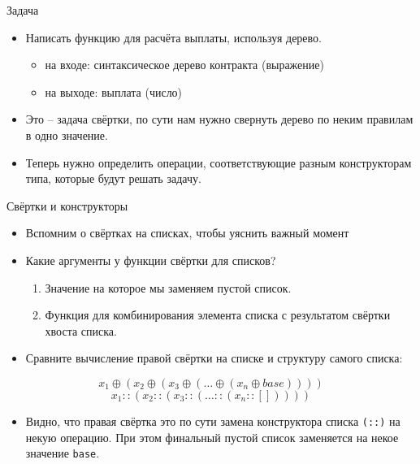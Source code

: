 \documentclass{beamer}
\begin{document}
\begin{frame}{Задача}
\begin{itemize}
\item
  Написать функцию для расчёта выплаты, используя дерево.

  \begin{itemize}
  \item
    на входе: синтаксическое дерево контракта (выражение)
  \item
    на выходе: выплата (число)
  \end{itemize}
\item
  Это -- задача свёртки, по сути нам нужно свернуть дерево по неким
  правилам в одно значение.
\item
  Теперь нужно определить операции, соответствующие разным конструкторам
  типа, которые будут решать задачу.
\end{itemize}
\end{frame}\begin{frame}{Свёртки и конструкторы}

\begin{itemize}
\item
  Вспомним о свёртках на списках, чтобы уяснить важный момент
\item
  Какие аргументы у функции свёртки для списков?

  \begin{enumerate}[1.]
  \item
    Значение на которое мы заменяем пустой список.
  \item
    Функция для комбинирования элемента списка с результатом свёртки
    хвоста списка.
  \end{enumerate}
\item
  Сравните вычисление правой свёртки на списке и структуру самого
  списка:
\end{itemize}

\begin{equation*}
  x_1 \oplus (x_2 \oplus (x_3 \oplus (\ldots \oplus (x_n \oplus base))))
\end{equation*}
\begin{equation*}
  x_1 :: (x_2 :: (x_3 :: (\ldots :: (x_n :: []))))
\end{equation*}

\begin{itemize}
\item
  Видно, что правая свёртка это по сути замена конструктора списка
  \texttt{(::)} на некую операцию. При этом финальный пустой список
  заменяется на некое значение \texttt{base}.
\end{itemize}
\end{frame}
\end{document}
